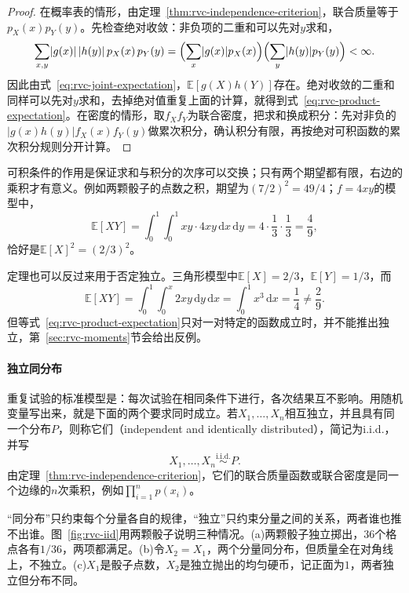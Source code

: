 \begin{proof}
在概率表的情形，由定理~\ref{thm:rvc-independence-criterion}，联合质量等于$p_X(x)p_Y(y)$。先检查绝对收敛：非负项的二重和可以先对$y$求和，
\[
 \sum_{x,y}\lvert g(x)\rvert\,\lvert h(y)\rvert\,p_X(x)\,p_Y(y)
 =\Bigl(\sum_{x}\lvert g(x)\rvert p_X(x)\Bigr)\Bigl(\sum_{y}\lvert h(y)\rvert p_Y(y)\Bigr)<\infty .
\]
因此由式~\eqref{eq:rvc-joint-expectation}，$\mathbb{E}[g(X)h(Y)]$存在。绝对收敛的二重和同样可以先对$y$求和，去掉绝对值重复上面的计算，就得到式~\eqref{eq:rvc-product-expectation}。在密度的情形，取$f_Xf_Y$为联合密度，把求和换成积分：先对非负的$\lvert g(x)h(y)\rvert f_X(x)f_Y(y)$做累次积分，确认积分有限，再按绝对可积函数的累次积分规则分开计算。
\end{proof}

可积条件的作用是保证求和与积分的次序可以交换；只有两个期望都有限，右边的乘积才有意义。例如两颗骰子的点数之积，期望为$(7/2)^{2}=49/4$；$f=4xy$的模型中，
\[
 \mathbb{E}[XY]=\int_{0}^{1}\!\!\int_{0}^{1}xy\cdot 4xy\,\mathrm{d}x\,\mathrm{d}y=4\cdot\frac13\cdot\frac13=\frac49 ,
\]
恰好是$\mathbb{E}[X]^{2}=(2/3)^{2}$。

定理也可以反过来用于否定独立。三角形模型中$\mathbb{E}[X]=2/3$，$\mathbb{E}[Y]=1/3$，而
\[
 \mathbb{E}[XY]=\int_{0}^{1}\!\!\int_{0}^{x}2xy\,\mathrm{d}y\,\mathrm{d}x=\int_{0}^{1}x^{3}\,\mathrm{d}x=\frac14\neq\frac29 .
\]
但等式~\eqref{eq:rvc-product-expectation}只对一对特定的函数成立时，并不能推出独立，第~\ref{sec:rvc-moments}节会给出反例。

\paragraph{独立同分布}
重复试验的标准模型是：每次试验在相同条件下进行，各次结果互不影响。用随机变量写出来，就是下面的两个要求同时成立。若$X_1,\dots,X_n$相互独立，并且具有同一个分布$P$，则称它们（independent and identically distributed），简记为i.i.d.，并写
\begin{equation}
 X_1,\dots,X_n\overset{\text{i.i.d.}}{\sim}P .
 \label{eq:rvc-iid}
\end{equation}
由定理~\ref{thm:rvc-independence-criterion}，它们的联合质量函数或联合密度是同一个边缘的$n$次乘积，例如$\prod_{i=1}^{n}p(x_i)$。

“同分布”只约束每个分量各自的规律，“独立”只约束分量之间的关系，两者谁也推不出谁。图~\ref{fig:rvc-iid}用两颗骰子说明三种情况。(a)两颗骰子独立掷出，$36$个格点各有$1/36$，两项都满足。(b)令$X_2=X_1$，两个分量同分布，但质量全在对角线上，不独立。(c)$X_1$是骰子点数，$X_2$是独立抛出的均匀硬币，记正面为$1$，两者独立但分布不同。

